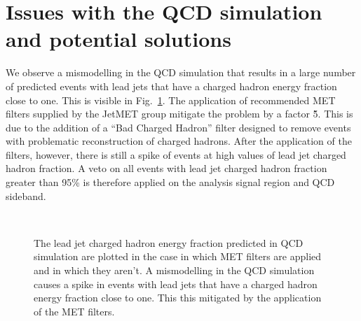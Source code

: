 \section{Issues with the QCD simulation and potential solutions}
\label{app:qcdMC}

We observe a mismodelling in the QCD simulation that results in a
large number of predicted events with lead jets that have a charged
hadron energy fraction close to one. This is visible in
Fig.~\ref{fig:qcdCHF}. The application of recommended MET filters
supplied by the JetMET group mitigate the problem by a factor \~5.
This is due to the addition of a ``Bad Charged Hadron'' filter
designed to remove events with problematic reconstruction of charged
hadrons. After the application of the filters, however, there is still
a spike of events at high values of lead jet charged hadron fraction.
A veto on all events with lead jet charged hadron fraction greater
than 95\% is therefore applied on the analysis signal region and QCD
sideband. 

\begin{figure}[h!]
  \begin{center}
     ~~
    \caption{ The lead jet charged hadron energy fraction predicted in QCD
    simulation are plotted in the case in which MET filters are
    applied and in which they aren't. A mismodelling in the QCD
    simulation causes a spike in events with lead jets that have a
    charged hadron energy fraction close to one. This this mitigated
    by the application of the MET filters.
    }
    \label{fig:qcdCHF}
  \end{center} 
\end{figure}

